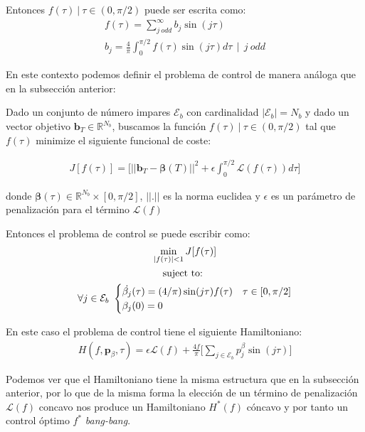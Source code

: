 Entonces  $f(\tau) \ | \ \tau \in (0,\pi/2)$ puede ser escrita como:
\begin{gather}
    f(\tau ) = \sum_{j \ odd}^\infty  b_j \sin(j \tau) \\
    b_j = \frac{4}{\pi}\int_0^{\pi/2} f(\tau ) \sin(j\tau)d\tau \ \ | \ \ j \ odd \label{bn_odd}
\end{gather}

En este contexto podemos definir el problema de control de manera análoga que en la subsección anterior:
\begin{problem}\label{OCP_bn}
    Dado un conjunto de número impares $\mathcal{E}_b$ con cardinalidad $|\mathcal{E}_b| = N_b$ y dado un vector objetivo $\bm{b}_T  \in \mathbb{R}^{N_b}$, buscamos la función $f(\tau ) \ | \ \tau \in (0,\pi/2)$ tal que  $f(\tau)$ minimize el siguiente funcional de coste:

        \begin{gather}
        J[f(\tau)] = \Bigg[ || \bm{b}_T - \bm{\beta}(T)||^2 + \epsilon \int_0^{\pi/2} \mathcal{L}(f(\tau)) d\tau \Bigg] 
    \end{gather}

    donde $ \bm{\beta}(\tau) \in \mathbb{R}^{N_b} \times [0,\pi/2] $,  $||.||$ es la norma euclidea y $\epsilon$ es un parámetro de penalización para el término $\mathcal{L}(f)$
    \newline

    Entonces el problema de control se puede escribir como:
    \begin{gather}
        \min_{|f(\tau) |<1} J[f(\tau)] \\
        \notag \text{suject to: } \\
        \notag \forall j \in \mathcal{E}_b \
        \begin{cases}
            \dot{\beta_j}(\tau) = (4/\pi) \sin(j\tau) f(\tau) & \tau \in [0,\pi/2]\label{dyn}\\
            \beta_j(0) = 0
        \end{cases} 
    \end{gather}
\end{problem}

En este caso el problema de control tiene el siguiente Hamiltoniano:
\begin{gather}
    H(f,\bm{p}_\beta,\tau) = \epsilon  \mathcal{L}(f)+ 
    \frac{4f}{\pi} \Bigg[ 
        \sum_{j \in \mathcal{E}_b} p^\beta_j \sin(j\tau) 
    \Bigg]
\end{gather}

Podemos ver que el Hamiltoniano tiene la misma estructura que en la subsección anterior, por lo que de la misma forma la elección de un término de penalización $\mathcal{L}(f)$ concavo nos produce un Hamiltoniano $H^*(f)$ cóncavo y por tanto un control óptimo $f^*$ \emph{bang-bang}.
